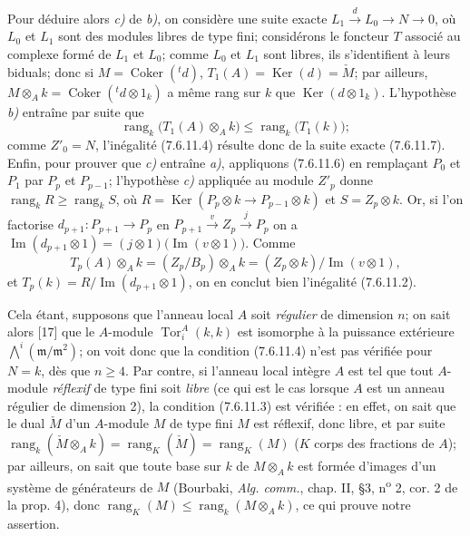 \begin{remark}[7.6.11]
Pour déduire alors \emph{c)} de \emph{b)}, on considère une suite exacte
$L_1\xrightarrow{d}L_0\longrightarrow N\longrightarrow0$,
où $L_0$ et $L_1$ sont des modules libres de type fini; considérons le foncteur
$T$ associé au complexe formé de $L_1$ et $L_0$; comme $L_0$ et $L_1$ sont
libres, ils s'identifient à leurs biduals; donc si
$M=\operatorname{Coker}({}^t d)$, $T_1(A)=\operatorname{Ker}(d)=\check M$;
par ailleurs, $M\otimes_A k=\operatorname{Coker}({}^t d\otimes1_k)$ a même rang
sur $k$ que $\operatorname{Ker}(d\otimes1_k)$. L'hypothèse \emph{b)} entraîne par suite
que
\[
  \operatorname{rang}_k\bigl(T_1(A)\otimes_A k\bigr)
  \leq
  \operatorname{rang}_k\bigl(T_1(k)\bigr);
\]
comme $Z'_0=N$, l'inégalité (7.6.11.4) résulte donc de la suite exacte
(7.6.11.7).
Enfin, pour prouver que \emph{c)} entraîne \emph{a)}, appliquons (7.6.11.6) en remplaçant
$P_0$ et $P_1$ par $P_p$ et $P_{p-1}$; l'hypothèse \emph{c)} appliquée au module
$Z'_p$ donne $\operatorname{rang}_kR\geq\operatorname{rang}_kS$, où
$R=\operatorname{Ker}(P_p\otimes k\longrightarrow P_{p-1}\otimes k)$ et $S=Z_p\otimes k$.
Or, si l'on factorise $d_{p+1}:P_{p+1}\to P_p$ en
$P_{p+1}\xrightarrow{v}Z_p\xrightarrow{j}P_p$
on a
$\operatorname{Im}(d_{p+1}\otimes1)=(j\otimes1)\bigl(\operatorname{Im}(v\otimes1)\bigr)$.
Comme
\[
  T_p(A)\otimes_A k
  =(Z_p/B_p)\otimes_A k
  =(Z_p\otimes k)/\operatorname{Im}(v\otimes1),
\]
et
$T_p(k)=R/\operatorname{Im}(d_{p+1}\otimes1)$,
on en conclut bien l'inégalité (7.6.11.2).

Cela étant, supposons que l'anneau local $A$ soit \emph{régulier} de dimension $n$;
on sait alors [17] que le $A$-module
$\operatorname{Tor}_i^A(k,k)$ est isomorphe à la puissance extérieure
$\bigwedge\nolimits^i(\mathfrak m/\mathfrak m^2)$;
on voit donc que la condition (7.6.11.4) n'est pas vérifiée pour $N=k$, dès que
$n\geq4$.
Par contre, si l'anneau local intègre $A$ est tel que tout $A$-module \emph{réflexif}
de type fini soit \emph{libre} (ce qui est le cas lorsque $A$ est un anneau régulier
de dimension 2), la condition (7.6.11.3) est vérifiée : en effet, on sait que le
dual $\check M$ d'un $A$-module $M$ de type fini $M$ est réflexif, donc libre, et
par suite
$\operatorname{rang}_k(\check M\otimes_A k)=\operatorname{rang}_K(\check M)=\operatorname{rang}_K(M)$
($K$ corps des fractions de $A$); par ailleurs, on sait que toute base sur $k$
de $M\otimes_A k$ est formée d'images d'un système de générateurs de $M$
(Bourbaki, \emph{Alg. comm.}, chap. II, \S 3, n\textsuperscript{o} 2, cor. 2 de
la prop. 4), donc
$\operatorname{rang}_K(M)\leq\operatorname{rang}_k(M\otimes_A k)$, ce qui
prouve notre assertion.
\end{remark}

